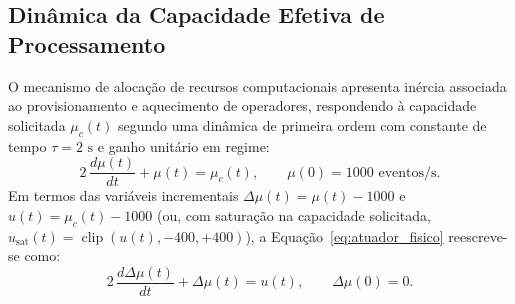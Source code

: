 \subsection{Dinâmica da Capacidade Efetiva de Processamento}\label{sec:dinamica_cap}
O mecanismo de alocação de recursos computacionais apresenta inércia associada ao provisionamento e aquecimento de operadores, respondendo à capacidade solicitada $\mu_c(t)$ segundo uma dinâmica de primeira ordem com constante de tempo $\tau = 2\text{ s}$ e ganho unitário em regime:
\begin{equation}
    2\,\frac{d\mu(t)}{dt} + \mu(t) = \mu_c(t), \qquad \mu(0) = 1000\text{ eventos/s}.
    \label{eq:atuador_fisico}
\end{equation}
Em termos das variáveis incrementais $\Delta\mu(t) = \mu(t) - 1000$ e $u(t) = \mu_c(t) - 1000$ (ou, com saturação na capacidade solicitada, $u_{\text{sat}}(t) = \operatorname{clip}(u(t), -400, +400)$), a Equação~\eqref{eq:atuador_fisico} reescreve-se como:
\begin{equation}
    2\,\frac{d\Delta\mu(t)}{dt} + \Delta\mu(t) = u(t), \qquad \Delta\mu(0) = 0.
    \label{eq:atuador_inc}
\end{equation}

